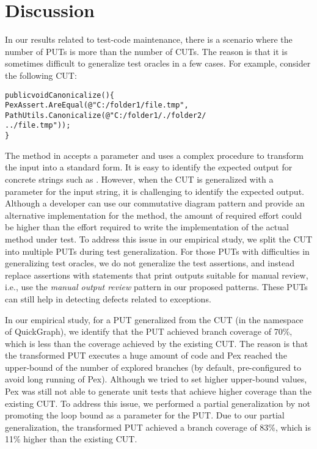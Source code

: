 \section{Discussion} 
\label{sec:limitations}

In our results related to test-code maintenance, there is a scenario where the number of PUTs is more than the number of CUTs. The reason is that it is sometimes difficult to generalize test oracles in a few cases. For example, consider the following CUT:\vspace*{-1.5ex}

\begin{CodeOut}
\begin{alltt}
public void Canonicalize() \{
\hspace*{0.1in}PexAssert.AreEqual(@"C:/folder1/file.tmp",
\hspace*{0.3in}PathUtils.Canonicalize(@"C:/folder1/./folder2/
\hspace*{0.3in}../file.tmp")); 
\}
\end{alltt}
\end{CodeOut} \vspace*{-1.5ex}

\noindent The  method in  accepts a  parameter and uses a complex procedure to transform the input into a standard form. It is easy to identify the expected output for concrete strings such as . However, when the CUT is generalized with a parameter for the input string, it is challenging to identify the expected output. Although a developer can use our commutative diagram pattern and provide an alternative implementation for the  method, the amount of required effort could be higher than the effort required to write the implementation of the actual method under test. To address this issue in our empirical study, we split the CUT into multiple PUTs during test generalization. For those PUTs with difficulties in generalizing test oracles, we do not generalize the test assertions, and instead replace assertions with statements that print outputs suitable for manual review, i.e., use the \emph{manual output review} pattern in our proposed patterns. These PUTs can still help in detecting defects related to exceptions.

In our empirical study, for a PUT generalized from the CUT  (in the  namespace of QuickGraph), we identify that the PUT achieved branch coverage of 70\%, which is less than the coverage achieved by the existing CUT. The reason is that the transformed PUT executes a huge amount of code and Pex reached the upper-bound of the number of explored branches (by default, pre-configured to avoid long running of Pex). Although we tried to set higher upper-bound values, Pex was still not able to generate unit tests that achieve higher coverage than the existing CUT. To address this issue, we performed a partial generalization by not promoting the loop bound as a parameter for the PUT. Due to our partial generalization, the transformed PUT achieved a branch coverage of 83\%, which is 11\% higher than the existing CUT.

